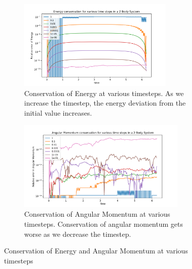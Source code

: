 \documentclass[12pt,a4paper]{article}
\begin{document}
\begin{figure}[H]
  \centering
  \begin{subfigure}{0.49\textwidth}
    \includegraphics[height = 1.7in]{2Body/2Body_Energy_Consv_dt.png}
    \caption{Conservation of Energy at various timesteps. As we increase the timestep, the energy deviation from the initial value increases.}
    \label{fig:dt_e}  
  \end{subfigure}
  \begin{subfigure}{0.49\textwidth}
    \includegraphics[height = 1.7in]{2Body/2Body_L_Consv_dt.png}
    \caption{Conservation of Angular Momentum at various timesteps. Conservation of angular momentum gets worse as we decrease the timestep.}
    \label{fig:dt_L}  
  \end{subfigure}
  \caption{Conservation of Energy and Angular Momentum at various timesteps}
\end{figure}
\end{document}
